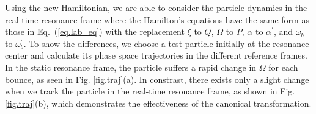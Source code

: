  Using the new Hamiltonian, we are able to consider  the particle dynamics in the real-time resonance frame
 where the Hamilton's equations have the same form as those in Eq.~(\ref{eq.lab_eq}) with the replacement
$\xi$ to $Q$,
$\Omega$ to $P$,
$\alpha$ to  $\alpha^\prime$, and 
${\omega_{b}}$ to ${\omega^\prime_{b}}$.
To show the differences, we choose a test particle initially at the resonance center and calculate its phase space trajectories in the different reference frames. In the static resonance frame, the particle suffers a rapid change in $\Omega$  for each bounce, as seen   in Fig. \ref{fig.traj}(a). In constrast, there exists only a slight change when we track the particle in the real-time resonance frame, as shown in Fig. \ref{fig.traj}(b), which demonstrates the effectiveness of the canonical transformation.

